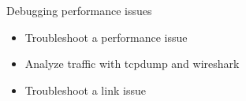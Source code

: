 \setuplabframe
{Debugging performance issues}
{
  \begin{itemize}
  \item Troubleshoot a performance issue
  \item Analyze traffic with tcpdump and wireshark
  \item Troubleshoot a link issue
  \end{itemize}
}
